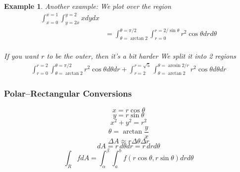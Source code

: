 \documentclass[11pt]{article}
\newtheorem{ex}{Example}
\begin{document}
\begin{ex}
  Another example: We plot over the region
  \begin{align*}
    \int_{x=0}^{x=1}\int_{y=2x}^{y=2} x dy dx \\
    &= \int_{\theta = \arctan 2}^{\theta = \pi/2} \int_{r=0}^{r=2/\sin \theta} r^2 \cos \theta dr d\theta\\
  \end{align*}

  If you want $r$ to be the outer, then it's a bit harder
  We split it into 2 regions
  \begin{align*}
    \int_{r=0}^{r=2} \int_{\theta = \arctan 2}^{\theta = \pi/2} r^2 \cos \theta d\theta dr
    + \int_{r=2}^{r=\sqrt{5}} \int_{\theta = \arctan 2}^{\theta = \arcsin 2/r} r^2 \cos \theta d\theta dr
  \end{align*}
\end{ex}
\subsubsection{Polar--Rectangular Conversions}
\[x = r\cos \theta\]
\[y=r\sin\theta\]
\[x^2+y^2=r^2\]
\[\theta = \arctan \frac{y}{x}\]
\[\Delta A \approx r \Delta \theta \Delta r\]
\[dA = r\, d\theta dr = r \, dr d\theta\]
\[\int_R f dA = \int_\alpha^\beta\int_a^b f(r\cos\theta, r\sin \theta) drd\theta\]
\end{document}
